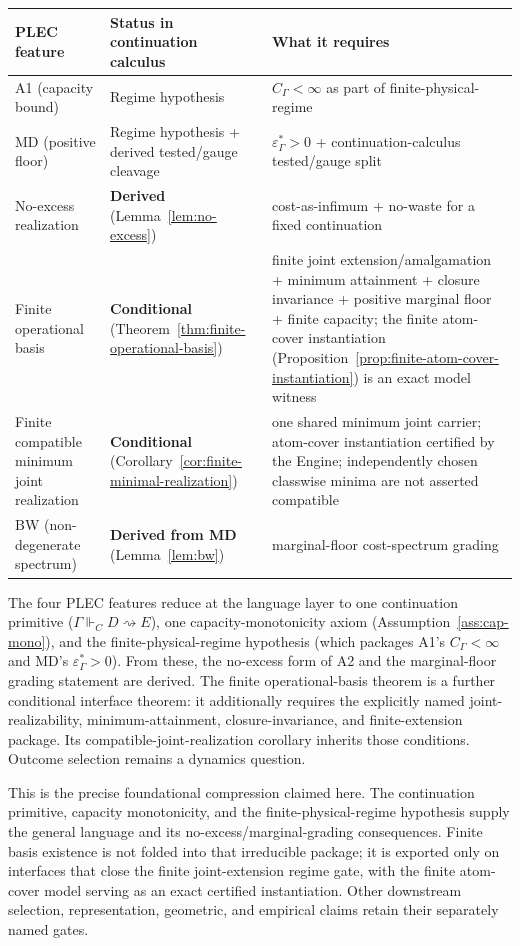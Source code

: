 \documentclass[11pt]{article}
\theoremstyle{remark}
\newcommand{\G}{\Gamma}
\newcommand{\entails}{\Vdash}
\newcommand{\goes}{\rightsquigarrow}
\newcommand{\floor}{\varepsilon^{\!*}_{\G}}
\begin{document}
\begin{center}
\begin{tabularx}{\textwidth}{p{}p{}X}
\toprule
\textbf{PLEC feature} & \textbf{Status in continuation calculus} & \textbf{What it requires}\\
\midrule
A1 (capacity bound) & Regime hypothesis & $C_\G < \infty$ as part of finite-physical-regime\\
MD (positive floor) & Regime hypothesis + derived tested/gauge cleavage & $\floor > 0$ + continuation-calculus tested/gauge split\\
No-excess realization & \textbf{Derived} (Lemma~\ref{lem:no-excess}) & cost-as-infimum + no-waste for a fixed continuation\\
Finite operational basis & \textbf{Conditional} (Theorem~\ref{thm:finite-operational-basis}) & finite joint extension/amalgamation + minimum attainment + closure invariance + positive marginal floor + finite capacity; the finite atom-cover instantiation (Proposition~\ref{prop:finite-atom-cover-instantiation}) is an exact model witness\\
Finite compatible minimum joint realization & \textbf{Conditional} (Corollary~\ref{cor:finite-minimal-realization}) & one shared minimum joint carrier; atom-cover instantiation certified by the Engine; independently chosen classwise minima are not asserted compatible\\
BW (non-degenerate spectrum) & \textbf{Derived from MD} (Lemma~\ref{lem:bw}) & marginal-floor cost-spectrum grading\\
\bottomrule
\end{tabularx}
\end{center}

The four PLEC features reduce at the language layer to one continuation primitive ($\G\entails_C D\goes E$), one capacity-monotonicity axiom (Assumption~\ref{ass:cap-mono}), and the finite-physical-regime hypothesis (which packages A1's $C_\G<\infty$ and MD's $\floor>0$).  From these, the no-excess form of A2 and the marginal-floor grading statement are derived.  The finite operational-basis theorem is a further conditional interface theorem: it additionally requires the explicitly named joint-realizability, minimum-attainment, closure-invariance, and finite-extension package.  Its compatible-joint-realization corollary inherits those conditions.  Outcome selection remains a dynamics question.

This is the precise foundational compression claimed here.  The continuation primitive, capacity monotonicity, and the finite-physical-regime hypothesis supply the general language and its no-excess/marginal-grading consequences.  Finite basis existence is not folded into that irreducible package; it is exported only on interfaces that close the finite joint-extension regime gate, with the finite atom-cover model serving as an exact certified instantiation.  Other downstream selection, representation, geometric, and empirical claims retain their separately named gates.
\end{document}
